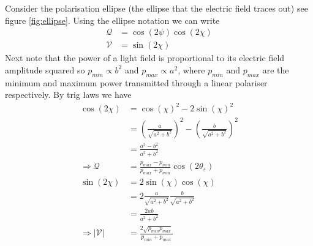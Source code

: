 \documentclass{article}
\begin{document}
Consider the polarisation ellipse (the ellipse that the electric field traces out) see figure \ref{fig:ellipse}. Using the ellipse notation we can write
\begin{align}
    \mathcal{Q} &= \cos(2\psi) \cos(2\chi)\\
    \mathcal{V} &= \sin(2\chi)
\end{align}
Next note that the power of a light field is proportional to its electric field amplitude squared so \(p_{min} \propto b^2\) and \(p_{max} \propto a^2\), where \(p_{min}\) and \(p_{max}\) are the minimum and maximum power transmitted through a linear polariser respectively. By trig laws we have 
\begin{align}
\cos(2\chi)&=\cos(\chi)^2-2\sin(\chi)^2\\
&= \left(\frac{a}{\sqrt{a^2+b^2}}\right)^2 - \left(\frac{b}{\sqrt{a^2+b^2}}\right)^2 \\
&= \frac{a^2-b^2}{a^2+b^2}\\
\Rightarrow \mathcal{Q}&=\frac{p_{max}-p_{min}}{p_{max}+p_{min}} \cos(2\theta_\varepsilon)\\
\sin(2\chi) &= 2\sin(\chi)\cos(\chi)\\
&=2 \frac{a}{\sqrt{a^2+b^2}} \frac{b}{\sqrt{a^2+b^2}}\\
&=\frac{2ab}{a^2+b^2}\\
\Rightarrow |\mathcal{V}| &= \frac{2\sqrt{p_{min}p_{max}}}{p_{min}+p_{max}}
\end{align}


\centering
\end{document}
